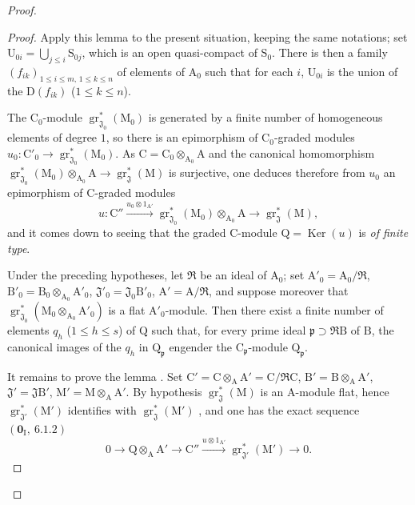 \begin{proof}
\begin{proof}
Apply this lemma to the present situation, keeping the same notations; set $\mathrm{U}_{0i}=\bigcup_{j\leqslant i}\mathrm{S}_{0j}$, which is an open quasi-compact of $\mathrm{S}_0$. There is then a family $(f_{ik})_{1\leqslant i\leqslant m,\,1\leqslant k\leqslant n}$ of elements of $\mathrm{A}_0$ such that for each $i$, $\mathrm{U}_{0i}$ is the union of the $\mathrm{D}(f_{ik})$ ($1\leqslant k\leqslant n$).


The $\mathrm{C}_0$-module $\operatorname{gr}^*_{\mathfrak{J}_0}(\mathrm{M}_0)$ is generated by a finite number of homogeneous elements of degree $1$, so there is an epimorphism of $\mathrm{C}_0$-graded modules $u_0:\mathrm{C}'_0\to\operatorname{gr}^*_{\mathfrak{J}_0}(\mathrm{M}_0)$. As $\mathrm{C}=\mathrm{C}_0\otimes_{\mathrm{A}_0}\mathrm{A}$ and the canonical homomorphism $\operatorname{gr}^*_{\mathfrak{J}_0}(\mathrm{M}_0)\otimes_{\mathrm{A}_0}\mathrm{A}\to\operatorname{gr}^*_\mathfrak{J}(\mathrm{M})$ is surjective, one deduces therefore from $u_0$ an epimorphism of C-graded modules
\[
  u:\mathrm{C}''\xrightarrow{u_0\otimes 1_{\mathrm{A}'}}\operatorname{gr}^*_{\mathfrak{J}_0}(\mathrm{M}_0)\otimes_{\mathrm{A}_0}\mathrm{A}\to\operatorname{gr}^*_\mathfrak{J}(\mathrm{M}),
\]
and it comes down to seeing that the graded C-module $\mathrm{Q}=\operatorname{Ker}(u)$ is \emph{of finite type}.

\begin{lemma}[11.2.9.6]
\label{IV.11.2.9.6}
Under the preceding hypotheses, let $\mathfrak{R}$ be an ideal of $\mathrm{A}_0$; set $\mathrm{A}'_0=\mathrm{A}_0/\mathfrak{R}$, $\mathrm{B}'_0=\mathrm{B}_0\otimes_{\mathrm{A}_0}\mathrm{A}'_0$, $\mathfrak{J}'_0=\mathfrak{J}_0\mathrm{B}'_0$, $\mathrm{A}'=\mathrm{A}/\mathfrak{R}$, and suppose moreover that $\operatorname{gr}^*_{\mathfrak{J}_0}(\mathrm{M}_0\otimes_{\mathrm{A}_0}\mathrm{A}'_0)$ is a flat $\mathrm{A}'_0$-module. Then there exist a finite number of elements $q_h$ ($1\leqslant h\leqslant s$) of $\mathrm{Q}$ such that, for every prime ideal $\mathfrak{p}\supset\mathfrak{R}\mathrm{B}$ of $\mathrm{B}$, the canonical images of the $q_h$ in $\mathrm{Q}_\mathfrak{p}$ engender the $\mathrm{C}_\mathfrak{p}$-module $\mathrm{Q}_\mathfrak{p}$.
\end{lemma}

It remains to prove the lemma . Set $\mathrm{C}'=\mathrm{C}\otimes_\mathrm{A}\mathrm{A}'=\mathrm{C}/\mathfrak{R}\mathrm{C}$, $\mathrm{B}'=\mathrm{B}\otimes_\mathrm{A}\mathrm{A}'$, $\mathfrak{J}'=\mathfrak{J}\mathrm{B}'$, $\mathrm{M}'=\mathrm{M}\otimes_\mathrm{A}\mathrm{A}'$. By hypothesis $\operatorname{gr}^*_\mathfrak{J}(\mathrm{M})$ is an A-module flat, hence $\operatorname{gr}^*_{\mathfrak{J}'}(\mathrm{M}')$ identifies with $\operatorname{gr}^*_\mathfrak{J}(\mathrm{M}')$ , and one has the exact sequence $(\mathbf{0}_\mathrm{I},~6.1.2)$
\begin{equation}
  0\to\mathrm{Q}\otimes_\mathrm{A}\mathrm{A}'\to\mathrm{C}''\xrightarrow{u\otimes 1_{\mathrm{A}'}}\operatorname{gr}^*_{\mathfrak{J}'}(\mathrm{M}')\to 0.
  \tag{11.2.9.7}
\end{equation}


\end{proof}
\end{proof}
